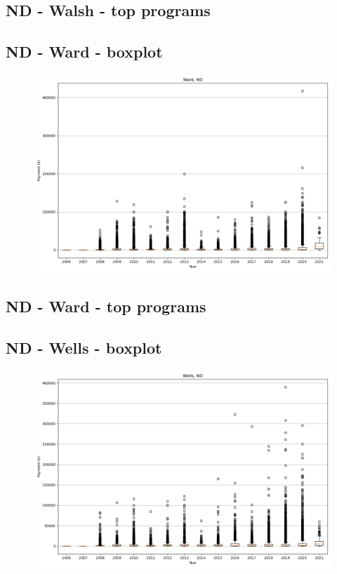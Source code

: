 \subsection*{ND - Walsh - top programs}

\newpage
\subsection*{ND - Ward - boxplot}
\begin{figure}[h]
\centering
\includegraphics[width=7in]{../output/boxplots/counties/Ward-ND_boxplot.png}
\end{figure}


\subsection*{ND - Ward - top programs}

\newpage
\subsection*{ND - Wells - boxplot}
\begin{figure}[h]
\centering
\includegraphics[width=7in]{../output/boxplots/counties/Wells-ND_boxplot.png}
\end{figure}


